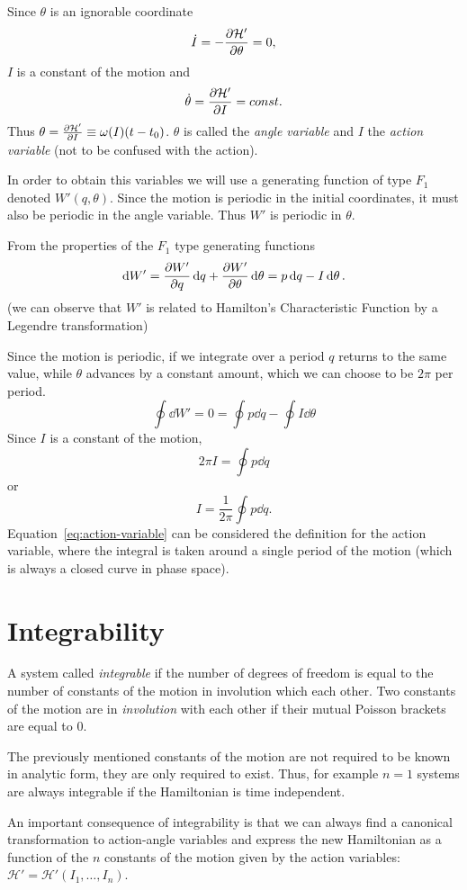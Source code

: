 \documentclass[../thesis.tex]{subfiles}
\theoremstyle{plain}
\begin{document}
Since \(\theta \) is an ignorable coordinate
\[
  \dot{I} = -\pdv{\mathcal{H'}}{\theta} = 0,
\]
\(I\) is a constant of the motion and
\[
  \dot{\theta} = \pdv{\mathcal{H'}}{I} = const.
\]
Thus \(\theta = \pdv{\mathcal{H'}}{I} (t-t_0) \equiv \omega(I) (t-t_0)\).
\(\theta \) is called the \emph{angle variable} and \(I\) the \emph{action variable}
(not to be confused with the action).

In order to obtain this variables we will use a generating function of type \(F_1\)
denoted \(W'(q,\theta)\). Since the motion is periodic in the initial coordinates, it
must also be periodic in the angle variable. Thus \(W'\) is periodic in \(\theta \).

From the properties of the \(F_1\) type generating functions
\[
  \dd{W'} = \pdv{W'}{q} \dd{q} + \pdv{W'}{\theta} \dd{\theta} = p \dd{q} - I \dd{\theta}.
\]
(we can observe that \(W'\) is related to Hamilton's Characteristic Function by a
Legendre transformation)

Since the motion is periodic, if we integrate over a period \(q\) returns to the same
value, while \(\theta \) advances by a constant amount, which we can choose to be
\(2\pi \) per period.
\[
  \oint \dd{W'} = 0 = \oint p \dd{q} - \oint I \dd{\theta}
\]
Since \(I\) is a constant of the motion,
\[
  2\pi I = \oint p \dd{q}
\]
or
\begin{equation}
  \label{eq:action-variable}
  I = \frac{1}{2\pi} \oint p \dd{q}.
\end{equation}
Equation~\eqref{eq:action-variable} can be considered the definition for the
action variable, where the integral is taken around a single period of the motion
(which is always a closed curve in phase space).

\section{Integrability}

A system called \emph{integrable} if the number of degrees of freedom is equal to the number
of constants of the motion in involution which each other. Two constants of the motion
are in \emph{involution} with each other if their mutual Poisson brackets are equal to \(0\).

The previously mentioned constants of the motion are not required to be known in analytic form,
they are only required to exist. Thus, for example \(n=1\) systems are always integrable if
the Hamiltonian is time independent.

An important consequence of integrability is that we can always find a canonical
transformation to action-angle variables and express the new Hamiltonian as a function
of the \(n\) constants of the motion given by the action variables:
\(\mathcal{H'}=\mathcal{H'}(I_1,\dotsc,I_n)\).
\end{document}
